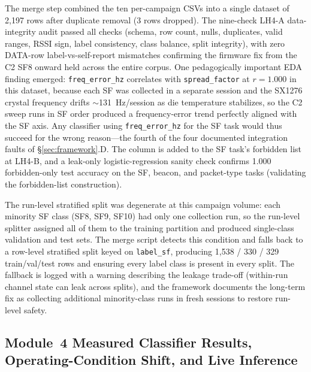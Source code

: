 \documentclass[conference]{IEEEtran}
\begin{document}
The merge step combined the ten per-campaign CSVs into a single dataset of 2{,}197 rows after duplicate removal (3 rows dropped). The nine-check LH4-A data-integrity audit passed all checks (schema, row count, nulls, duplicates, valid ranges, RSSI sign, label consistency, class balance, split integrity), with zero DATA-row label-vs-self-report mismatches confirming the firmware fix from the C2 SF8 onward held across the entire corpus. One pedagogically important EDA finding emerged: \texttt{freq\_error\_hz} correlates with \texttt{spread\_factor} at $r=1.000$ in this dataset, because each SF was collected in a separate session and the SX1276 crystal frequency drifts $\sim$131~Hz/session as die temperature stabilizes, so the C2 sweep runs in SF order produced a frequency-error trend perfectly aligned with the SF axis. Any classifier using \texttt{freq\_error\_hz} for the SF task would thus succeed for the wrong reason---the fourth of the four documented integration faults of \S\ref{sec:framework}.D. The column is added to the SF task's forbidden list at LH4-B, and a leak-only logistic-regression sanity check confirms 1.000 forbidden-only test accuracy on the SF, beacon, and packet-type tasks (validating the forbidden-list construction).

The run-level stratified split was degenerate at this campaign volume: each minority SF class (SF8, SF9, SF10) had only one collection run, so the run-level splitter assigned all of them to the training partition and produced single-class validation and test sets. The merge script detects this condition and falls back to a row-level stratified split keyed on \texttt{label\_sf}, producing 1{,}538 / 330 / 329 train/val/test rows and ensuring every label class is present in every split. The fallback is logged with a warning describing the leakage trade-off (within-run channel state can leak across splits), and the framework documents the long-term fix as collecting additional minority-class runs in fresh sessions to restore run-level safety.

\subsection{Module~4 Measured Classifier Results, Operating-Condition Shift, and Live Inference}\label{sec:m4measured}
\end{document}
